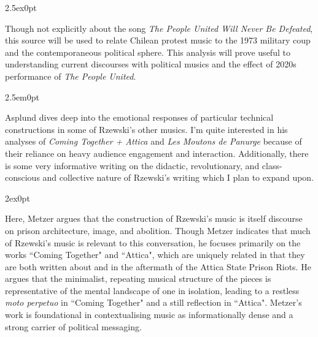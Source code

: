 \documentclass[14pt, letterpaper]{article}
\begin{document}
\clearpage


\begin{adjustwidth}{2.5ex}{0pt}

  Though not explicitly about the song \textit{The People United Will Never Be Defeated}, this source will be used to relate Chilean protest music to the 1973 military coup and the contemporaneous political sphere. This analysis will prove useful to understanding current discourses with political musics and the effect of 2020s performance of \textit{The People United}.

\end{adjustwidth}

\clearpage


\begin{adjustwidth}{2.5em}{0pt}

  Asplund dives deep into the emotional responses of particular technical constructions in some of Rzewski's other musics. I'm quite interested in his analyses of \textit{Coming Together + Attica} and \textit{Les Moutons de Panurge} because of their reliance on heavy audience engagement and interaction. Additionally, there is some very informative writing on the didactic, revolutionary, and class-conscious and collective nature of Rzewski's writing which I plan to expand upon.

\end{adjustwidth}

\clearpage


\begin{adjustwidth}{2ex}{0pt}

  Here, Metzer
  argues that the construction of Rzewski's music is itself discourse
  on prison architecture, image, and abolition. Though Metzer indicates
  that much of Rzewski's music is relevant to this conversation, he
  focuses primarily on the works ``Coming Together" and ``Attica", which
  are uniquely related in that they are both written about and in the
  aftermath of the Attica State Prison Riots. He argues that the minimalist,
  repeating musical structure of the pieces is representative of the mental
  landscape of one in isolation, leading to a restless \textit{moto perpetuo}
  in ``Coming Together" and a still reflection in ``Attica". Metzer's work
  is foundational in contextualising music as informationally dense and
  a strong carrier of political messaging.

\end{adjustwidth}
\end{document}
